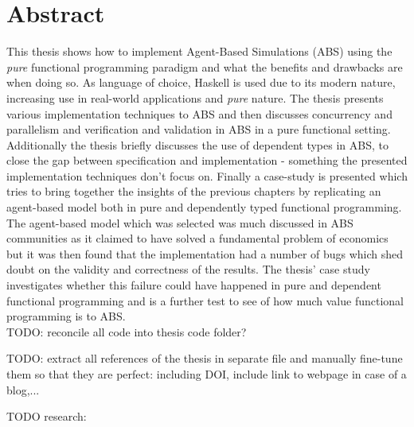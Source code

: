 \documentclass[oneside]{book}
\begin{document}
\section*{Abstract}
This thesis shows how to implement Agent-Based Simulations (ABS) using the \textit{pure} functional programming paradigm and what the benefits and drawbacks are when doing so. As language of choice, Haskell is used due to its modern nature, increasing use in real-world applications and \textit{pure} nature. The thesis presents various implementation techniques to ABS and then discusses concurrency and parallelism and verification and validation in ABS in a pure functional setting. Additionally the thesis briefly discusses the use of dependent types in ABS, to close the gap between specification and implementation - something the presented implementation techniques don't focus on.
Finally a case-study is presented which tries to bring together the insights of the previous chapters by replicating an agent-based model both in pure and dependently typed functional programming. The agent-based model which was selected was much discussed in ABS communities as it claimed to have solved a fundamental problem of economics but it was then found that the implementation had a number of bugs which shed doubt on the validity and correctness of the results. The thesis' case study investigates whether this failure could have happened in pure and dependent functional programming and is a further test to see of how much value functional programming is to ABS. \\

TODO: reconcile all code into thesis code folder?

TODO: extract all references of the thesis in separate file and manually fine-tune them so that they are perfect: including DOI, include link to webpage in case of a blog,...

TODO research:
\end{document}
